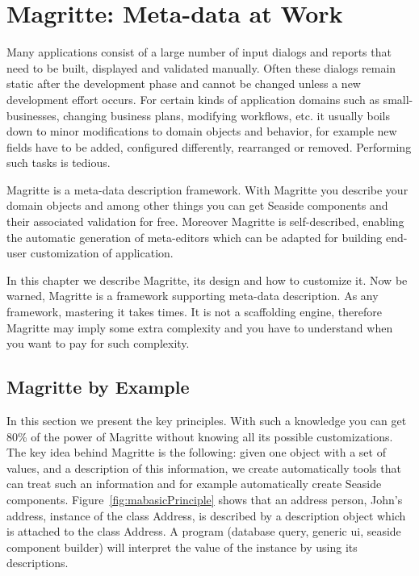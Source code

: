 \documentclass[a4paper,10pt,twoside]{book}
\begin{document}
    \sloppy
\fi



\chapter{Magritte: Meta-data at Work}
\label{cha:magritte}





Many applications consist of a large number of input dialogs and reports 
that need to be built, displayed and validated manually. Often these dialogs 
remain static after the development phase and cannot be changed unless a 
new development effort occurs.  For certain kinds of application domains such 
as small-businesses, changing business plans, modifying workflows, etc. it usually boils
down to minor modifications to domain objects and behavior, for example new fields have to be 
added, configured differently, rearranged or removed. Performing such tasks is tedious. 

Magritte is a meta-data description framework. With Magritte you describe your domain objects 
and among other things you can get Seaside components and their associated validation for free.  
Moreover Magritte is self-described, enabling the automatic generation of meta-editors which can 
be adapted for building end-user customization of application. 

In this chapter we describe Magritte, its design and how to customize it. Now be warned, Magritte
is a framework supporting meta-data description. As any framework, mastering it takes times. 
It is not a scaffolding engine, therefore Magritte may imply some extra complexity and 
you have to understand when you want to pay for such complexity. 



\section{Magritte by Example}
In this section we present the key principles. With such a knowledge you can get 80\% of the power of Magritte
without knowing all its possible customizations. The key idea behind Magritte is the following: given one object with a set of values, and a description of this information, we create automatically tools that can treat such an information and for example automatically create Seaside components. Figure~\ref{fig:mabasicPrinciple} shows that an address person, John's address, instance of the class Address, is described by a description object which is attached to the class Address. A program (database query, generic ui, seaside component builder) will interpret the value of the instance by using its descriptions. 
\end{document}
